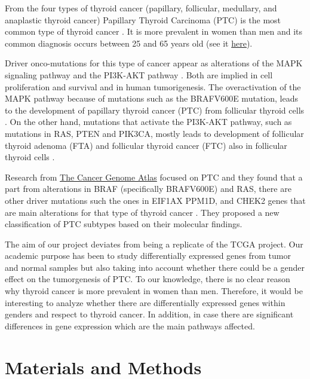 \documentclass[9pt,twocolumn,twoside]{gsajnl}
\begin{document}
From the four types of thyroid cancer (papillary, follicular, medullary, and anaplastic thyroid cancer) Papillary Thyroid Carcinoma (PTC) is the most common type of thyroid cancer \citep{Agrawal2014a}. It is more prevalent in women than men and its common diagnosis occurs between 25 and 65 years old (see it \href{http://www.cancer.org/cancer/thyroidcancer/detailedguide/thyroid-cancer-risk-factors}{here}).

Driver onco-mutations for this type of cancer appear as alterations of the MAPK signaling pathway and the PI3K-AKT pathway \citep{Kimura2003}. Both are implied in cell proliferation and survival and in human tumorigenesis. The overactivation of the MAPK pathway because of mutations such as the BRAFV600E mutation, leads to the development of papillary thyroid cancer (PTC) from follicular thyroid cells \citep{Xing2013a}. On the other hand, mutations that activate the PI3K-AKT pathway, such as mutations in RAS, PTEN and PIK3CA, mostly leads to development of follicular thyroid adenoma (FTA) and follicular thyroid cancer (FTC) also in follicular thyroid cells \citep{Xing2013a}.

Research from \href{http://cancergenome.nih.gov/cancersselected/thyroid}{ The Cancer Genome Atlas} focused on PTC and they found that a part from alterations in BRAF (specifically BRAFV600E) and RAS, there are other driver mutations such the ones in EIF1AX PPM1D, and CHEK2 genes that are main alterations for that type of thyroid cancer . They proposed a new classification of PTC subtypes based on their molecular findings. 

The aim of our project deviates from being a replicate of the TCGA project. Our academic purpose has been to study differentially expressed genes from tumor and normal samples but also taking into account whether there could be a gender effect on the tumorgenesis of PTC. To our knowledge, there is no clear reason why thyroid cancer is more prevalent in women than men. Therefore, it would be interesting to analyze whether there are differentially expressed genes within genders and respect to thyroid cancer. In addition, in case there are significant differences in gene expression which are the main pathways affected. 


\section*{Materials and Methods}
\end{document}
